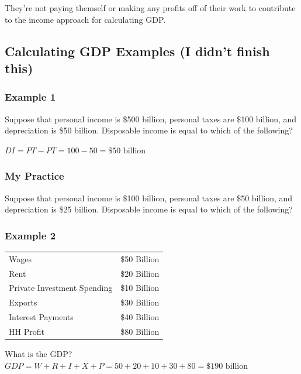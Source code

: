 \documentclass[
  letterpaper,
  DIV=11,
  numbers=noendperiod]{scrartcl}
\begin{document}
They're not paying themself or making any profits off of their work to
contribute to the income approach for calculating GDP.

\subsection{Calculating GDP Examples (I didn't finish
this)}\label{calculating-gdp-examples-i-didnt-finish-this}

\subsubsection{Example 1}\label{example-1}

Suppose that personal income is \$500 billion, personal taxes are \$100
billion, and depreciation is \$50 billion. Disposable income is equal to
which of the following?

\(DI = PT - PT = 100 - 50 = \$50 \text{ billion}\)

\subsubsection{My Practice}\label{my-practice}

Suppose that personal income is \$100 billion, personal taxes are \$50
billion, and depreciation is \$25 billion. Disposable income is equal to
which of the following?

\subsubsection{Example 2}\label{example-2}

\begin{longtable}[]{@{}
  >{\raggedright\arraybackslash}p{}
  >{\raggedright\arraybackslash}p{}@{}}
\toprule\noalign{}
\endhead
\bottomrule\noalign{}
\endlastfoot
Wages & \$50 Billion \\
Rent & \$20 Billion \\
Private Investment Spending & \$10 Billion \\
Exports & \$30 Billion \\
Interest Payments & \$40 Billion \\
HH Profit & \$80 Billion \\
\end{longtable}

What is the GDP?
\(GDP = W + R + I + X + P = 50 + 20 + 10 + 30 + 80 = \$190 \text{ billion}\)
\end{document}
